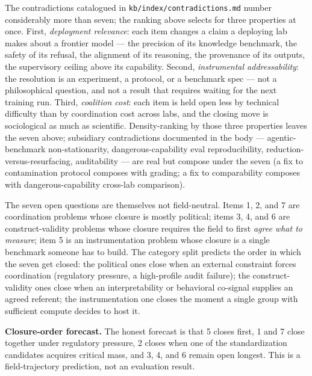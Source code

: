 The contradictions catalogued in
\texttt{kb/index/contradictions.md} number considerably more than
seven; the ranking above selects for three properties at once.
First, \emph{deployment relevance}: each item changes a claim a
deploying lab makes about a frontier model --- the precision of
its knowledge benchmark, the safety of its refusal, the alignment
of its reasoning, the provenance of its outputs, the supervisory
ceiling above its capability. Second, \emph{instrumental
addressability}: the resolution is an experiment, a protocol, or a
benchmark spec --- not a philosophical question, and not a result
that requires waiting for the next training run. Third,
\emph{coalition cost}: each item is held open less by technical
difficulty than by coordination cost across labs, and the closing
move is sociological as much as scientific. Density-ranking by
those three properties leaves the seven above; subsidiary
contradictions documented in the body --- agentic-benchmark
non-stationarity, dangerous-capability eval reproducibility,
 reduction-versus-resurfacing, 
auditability --- are real but compose under the seven (a fix to
contamination protocol composes with  grading; a fix
to  comparability composes with dangerous-capability cross-lab
comparison).

\begin{contradiction}
The seven open questions are themselves not field-neutral. Items
1, 2, and 7 are coordination problems whose closure is mostly
political; items 3, 4, and 6 are construct-validity problems whose
closure requires the field to first \emph{agree what to measure};
item 5 is an instrumentation problem whose closure is a single
benchmark someone has to build. The category split predicts the
order in which the seven get closed: the political ones close
when an external constraint forces coordination
(regulatory pressure, a high-profile audit failure); the
construct-validity ones close when an interpretability or
behavioral co-signal supplies an agreed referent; the
instrumentation one closes the moment a single group with
sufficient compute decides to host it.
\end{contradiction}

\begin{speculation}
\textbf{Closure-order forecast.} The honest forecast is
that 5 closes first, 1 and 7 close together under regulatory
pressure, 2 closes when one of the standardization candidates
acquires critical mass, and 3, 4, and 6 remain open longest. This
is a field-trajectory prediction, not an evaluation result.
\end{speculation}

